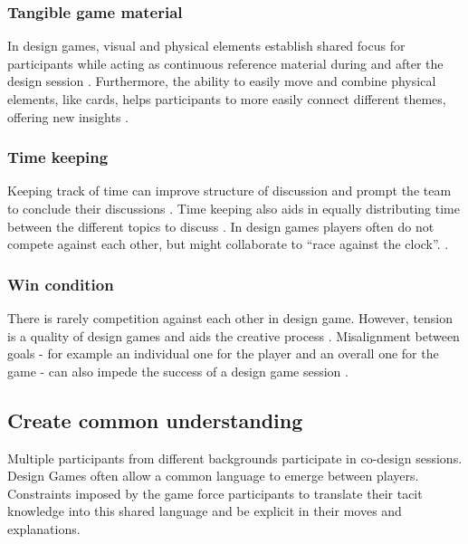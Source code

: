 \documentclass[draft,twoside]{vutinfth}
\begin{document}
            \subsubsection{Tangible game material}
            In design games, visual and physical elements establish shared focus for participants 
            while acting as continuous reference material during and after the design session 
            \cite{vaajakallioDesignGamesCodesign2014}. 
            Furthermore, the ability to easily move and combine physical elements, like cards, helps participants 
            to more easily connect different themes, offering new insights \cite{hatamiFacilitatingServiceInteractions2016}.
            
            \subsubsection{Time keeping}
            Keeping track of time can improve structure of discussion and prompt the team to conclude their discussions \cite{eriksenTakingDesignGames2014}. 
            Time keeping also aids in equally distributing time between the different topics to discuss \cite{eriksenTakingDesignGames2014}. 
            In design games players often do not compete against each other, but might collaborate to ``race against the clock''. \cite{fikarGroundedTheoryZur2023}. 

            \subsubsection{Win condition}
            There is rarely competition against each other in design game. However, tension is a quality of design games and 
            aids the creative process \cite{vaajakallioDesignGamesCodesign2014}. 
            Misalignment between goals - for example an 
            individual one for the player and an overall one for the game - can also impede the success of a design game session
            \cite{kessnerWickedPlayWicked2020, fikarGroundedTheoryZur2023}. 

        \subsection{Create common understanding}
        Multiple participants from different backgrounds participate in co-design sessions. Design Games often 
        allow a common language to emerge between players. Constraints imposed by the game force participants 
        to translate their tacit knowledge into this shared language and be explicit in their moves and explanations. 
\end{document}
